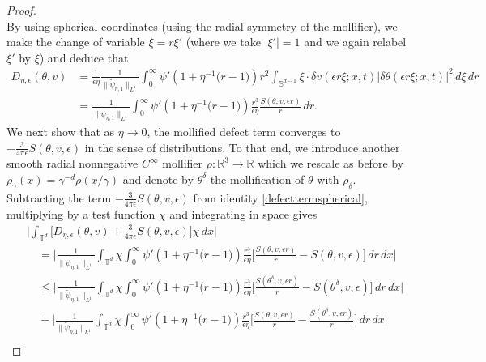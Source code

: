 \documentclass[11pt,reqno]{amsart}
\theoremstyle{definition}
\numberwithin{equation}{section}
\begin{document}
\begin{proof}
\begin{equation}
\end{equation}
By using spherical coordinates (using the radial symmetry of the mollifier), we make the change of variable $\xi = r \xi'$ (where we take $\lvert \xi' \rvert = 1$ and we again relabel $\xi'$ by $\xi$) and deduce that
\begin{align}
D_{\eta,\epsilon} (\theta,v) &= \frac{1}{\epsilon \eta} \frac{1}{\lVert \tilde{\psi}_{\eta,1} \rVert_{L^1}} \int_0^\infty \psi' \left( 1 + \eta^{-1} \big( r - 1 \big) \right) r^2 \int_{\mathbb{S}^{d-1}} \xi \cdot \delta v (\epsilon r \xi;x,t) \lvert \delta \theta (\epsilon r \xi; x,t) \rvert^2 \, d \xi \, dr \nonumber \\
&= \frac{1}{\lVert \tilde{\psi}_{\eta,1} \rVert_{L^1}} \int_0^\infty \psi' \left( 1 + \eta^{-1} \big( r - 1 \big) \right) \frac{r^3}{\epsilon \eta} \frac{S(\theta,v, \epsilon r)}{r} \, dr. \label{defecttermspherical}
\end{align}
We next show that as $\eta \rightarrow 0$, the mollified defect term converges to $- \frac{3}{4 \pi \epsilon} S(\theta,v, \epsilon)$ in the sense of distributions. To that end, we introduce another smooth radial nonnegative $C^\infty$ mollifier $\rho : \mathbb{R}^3 \rightarrow \mathbb{R}$ which we rescale as before by $\rho_\gamma (x) = \gamma^{-d} \rho (x/\gamma)$ and denote by $\theta^\delta$ the mollification of $\theta$ with $\rho_\delta$. Subtracting the term $- \frac{3}{4 \pi \epsilon} S(\theta,v, \epsilon)$ from identity \eqref{defecttermspherical}, multiplying by a test function $\chi$ and integrating in space gives
\begin{align}
\nonumber&\bigg\lvert \int_{\mathbb{T}^d} \big[ D_{\eta,\epsilon} (\theta,v) + \frac{3}{4 \pi \epsilon} S(\theta,v, \epsilon) \big] \chi \, dx \bigg\rvert \\
\nonumber&\quad = \bigg\lvert \frac{1}{\lVert \tilde{\psi}_{\eta,1} \rVert_{L^1}} \int_{\mathbb{T}^d} \chi \int_0^\infty \psi' \left( 1 + \eta^{-1} \big( r - 1 \big) \right) \frac{r^3}{\epsilon \eta} \bigg[ \frac{S(\theta,v, \epsilon r)}{r} - S(\theta,v, \epsilon) \bigg] \, dr \, dx \bigg\rvert \\
\nonumber&\quad\leq \bigg\lvert \frac{1}{\lVert \tilde{\psi}_{\eta,1} \rVert_{L^1}} \int_{\mathbb{T}^d} \chi \int_0^\infty \psi' \left( 1 + \eta^{-1} \big( r - 1 \big) \right) \frac{r^3}{\epsilon \eta} \bigg[ \frac{S(\theta^\delta,v, \epsilon r)}{r} - S(\theta^\delta,v, \epsilon) \bigg] \, dr \, dx \bigg\rvert \\
\nonumber&\quad+ \bigg\lvert \frac{1}{\lVert \tilde{\psi}_{\eta,1} \rVert_{L^1}} \int_{\mathbb{T}^d} \chi \int_0^\infty \psi' \left( 1 + \eta^{-1} \big( r - 1 \big) \right) \frac{r^3}{\epsilon \eta} \bigg[ \frac{S(\theta,v, \epsilon r)}{r} - \frac{S(\theta^\delta,v, \epsilon r)}{r} \bigg] \, dr \, dx \bigg\rvert \\

\end{align}
\end{proof}
\end{document}
